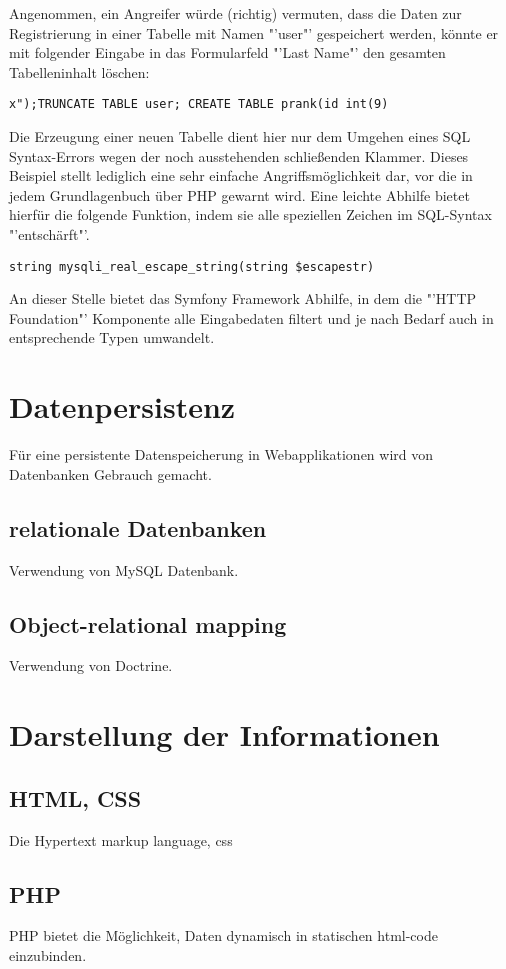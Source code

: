 \documentclass[12pt]{report}
\begin{document}
Angenommen, ein Angreifer würde (richtig) vermuten, dass die Daten zur Registrierung in einer Tabelle mit Namen "'user"' gespeichert werden, könnte er mit folgender Eingabe in das Formularfeld "'Last Name"' den gesamten Tabelleninhalt löschen:
\begin{lstlisting}
x");TRUNCATE TABLE user; CREATE TABLE prank(id int(9)
\end{lstlisting}
Die Erzeugung einer neuen Tabelle dient hier nur dem Umgehen eines SQL Syntax-Errors wegen der noch ausstehenden schließenden Klammer.
Dieses Beispiel stellt lediglich eine sehr einfache Angriffsmöglichkeit dar, vor die in jedem Grundlagenbuch über PHP gewarnt wird. Eine leichte Abhilfe bietet hierfür die folgende Funktion, indem sie alle speziellen Zeichen im SQL-Syntax "'entschärft"'.
\begin{lstlisting}
string mysqli_real_escape_string(string $escapestr)
\end{lstlisting}

An dieser Stelle bietet das Symfony Framework Abhilfe, in dem die "'HTTP Foundation"' Komponente alle Eingabedaten filtert und je nach Bedarf auch in entsprechende Typen umwandelt.\cite{sf2:HTTPFoundation}

\section{Datenpersistenz}
Für eine persistente Datenspeicherung in Webapplikationen wird von Datenbanken Gebrauch gemacht.
\subsection{relationale Datenbanken}
Verwendung von MySQL Datenbank.
\subsection{Object-relational mapping}
Verwendung von Doctrine.

\section{Darstellung der Informationen}
\subsection{HTML, CSS}
Die Hypertext markup language, css
\subsection{PHP}
PHP bietet die Möglichkeit, Daten dynamisch in statischen html-code einzubinden.
\end{document}
